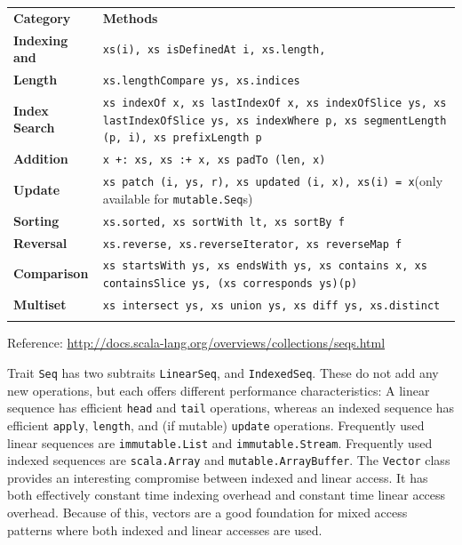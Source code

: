 \documentclass[a4paper,twoside,10pt,landscape]{article}
\begin{document}
\begin{multicols}{3}
\begin{center}
\begin{tabular}{@{}lp{6.5cm}@{}}
\hline\noalign{\smallskip}
\textbf{Category} & \textbf{Methods} \\
\noalign{\smallskip}\hline\noalign{\smallskip}
\textbf{Indexing and} & \texttt{xs(i), xs isDefinedAt i, xs.length,}\\
\textbf{Length} & \texttt{xs.lengthCompare ys, xs.indices}\\
\textbf{Index Search} & \texttt{xs indexOf x, xs lastIndexOf x, xs indexOfSlice ys, xs lastIndexOfSlice ys, xs indexWhere p, xs segmentLength (p, i), xs prefixLength p}\\
\textbf{Addition} & \texttt{x +: xs, xs :+ x, xs padTo (len, x)}\\
\textbf{Update} & \texttt{xs patch (i, ys, r), xs updated (i, x), xs(i) = x}(only available for \texttt{mutable.Seq}s)\\
\textbf{Sorting} & \texttt{xs.sorted, xs sortWith lt, xs sortBy f}\\
\textbf{Reversal} & \texttt{xs.reverse, xs.reverseIterator, xs reverseMap f}\\
\textbf{Comparison} & \texttt{xs startsWith ys, xs endsWith ys, xs contains x, xs containsSlice ys, (xs corresponds ys)(p)}\\
\textbf{Multiset} & \texttt{xs intersect ys, xs union ys, xs diff ys, xs.distinct}\\
\noalign{\smallskip}\hline
\end{tabular}
Reference: \url{http://docs.scala-lang.org/overviews/collections/seqs.html}
\end{center}

Trait \texttt{Seq} has two subtraits \texttt{LinearSeq}, and \texttt{IndexedSeq}. These do not add any new operations, but each offers different performance characteristics: A linear sequence has efficient \texttt{head} and \texttt{tail} operations, whereas an indexed sequence has efficient \texttt{apply}, \texttt{length}, and (if mutable) \texttt{update} operations. Frequently used linear sequences are \texttt{immutable.List} and \texttt{immutable.Stream}. Frequently used indexed sequences are \texttt{scala.Array} and \texttt{mutable.ArrayBuffer}. The \texttt{Vector} class provides an interesting compromise between indexed and linear access. It has both effectively constant time indexing overhead and constant time linear access overhead. Because of this, vectors are a good foundation for mixed access patterns where both indexed and linear accesses are used. 


\end{multicols}
\end{document}

